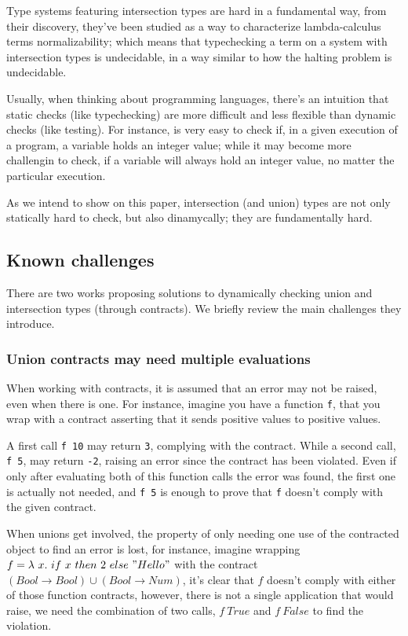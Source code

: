 Type systems featuring intersection types are hard in a fundamental way,
from their discovery, they've been studied as a way to characterize
lambda-calculus terms normalizability; which means that typechecking a
term on a system with intersection types is undecidable, in a way
similar to how the halting problem is undecidable.

Usually, when thinking about programming languages, there's an intuition
that static checks (like typechecking) are more difficult and less flexible
than dynamic checks (like testing). For instance, is very easy to check if,
in a given execution of a program, a variable holds an integer value; while it
may become more challengin to check, if a variable will always hold an integer value,
no matter the particular execution.

As we intend to show on this paper, intersection (and union) types are not only
statically hard to check, but also dinamycally; they are fundamentally hard.

\subsection{Known challenges}

There are two works proposing solutions to dynamically checking union and intersection
types (through contracts). We briefly review the main challenges they introduce.

\subsubsection*{Union contracts may need multiple evaluations}

When working with contracts, it is assumed that an error may not be raised, even
when there is one. For instance, imagine you have a function \texttt{f}, that
you wrap with a contract asserting that it sends positive values to positive values.

A first call \texttt{f 10} may return \texttt{3}, complying with the contract.
While a second call, \texttt{f 5}, may return \texttt{-2}, raising an error since
the contract has been violated. Even if only after evaluating both of this function calls
the error was found, the first one is actually not needed, and \texttt{f 5} is enough to
prove that \texttt{f} doesn't comply with the given contract.

When unions get involved, the property of only needing one use of the contracted object
to find an error is lost,
for instance, imagine wrapping $f = \lambda~x.~if~x~then~2~else~"Hello"$
with the contract $(Bool \rightarrow Bool) \cup (Bool \rightarrow Num)$, it's
clear that $f$ doesn't comply with either of those function contracts, however, there
is not a single application that would raise, we need the combination of two calls,
$f~True$ and $f~False$ to find the violation.

